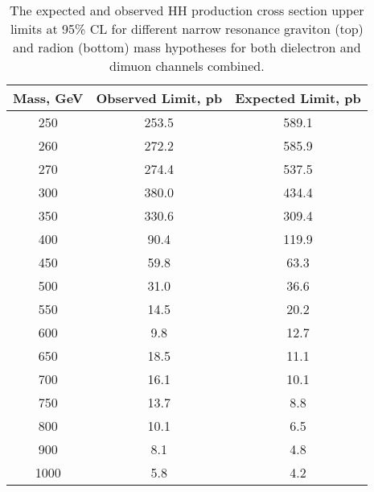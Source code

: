 \begin{table}
\begin{center}
\caption{The expected and observed HH production cross section upper limits at 95\% CL for different
narrow resonance graviton (top) and radion (bottom) mass hypotheses for both dielectron and dimuon channels combined.}
\label{finalLimits}
\begin{tabular}{|c|c|c|}
\hline
Mass, GeV &  Observed Limit, pb &  Expected Limit, pb \\
\hline
      250 &               253.5 &               589.1 \\
      260 &               272.2 &               585.9 \\
      270 &               274.4 &               537.5 \\
      300 &               380.0 &               434.4 \\
      350 &               330.6 &               309.4 \\
      400 &                90.4 &               119.9 \\
      450 &                59.8 &                63.3 \\
      500 &                31.0 &                36.6 \\
      550 &                14.5 &                20.2 \\
      600 &                 9.8 &                12.7 \\
      650 &                18.5 &                11.1 \\
      700 &                16.1 &                10.1 \\
      750 &                13.7 &                 8.8 \\
      800 &                10.1 &                 6.5 \\
      900 &                 8.1 &                 4.8 \\
     1000 &                 5.8 &                 4.2 \\
\hline
\end{tabular}

\end{center}
\end{table}
